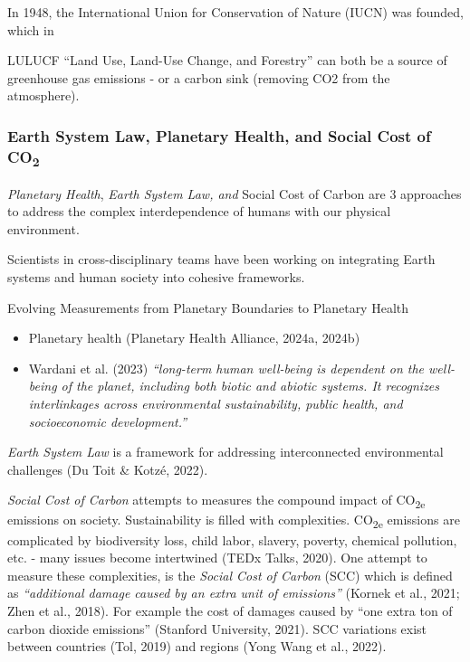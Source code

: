 \documentclass[
  letterpaper,
  DIV=11,
  numbers=noendperiod]{scrartcl}
\begin{document}
In 1948, the International Union for Conservation of Nature (IUCN) was
founded, which in

LULUCF ``Land Use, Land-Use Change, and Forestry'' can both be a source
of greenhouse gas emissions - or a carbon sink (removing CO2 from the
atmosphere).

\subsubsection{\texorpdfstring{Earth System Law, Planetary Health, and
Social Cost of
CO\textsubscript{2}}{Earth System Law, Planetary Health, and Social Cost of CO2}}\label{earth-system-law-planetary-health-and-social-cost-of-co2}

\emph{Planetary Health}, \emph{Earth System Law, and} Social Cost of
Carbon are 3 approaches to address the complex interdependence of humans
with our physical environment.

Scientists in cross-disciplinary teams have been working on integrating
Earth systems and human society into cohesive frameworks.

Evolving Measurements from Planetary Boundaries to Planetary Health

\begin{itemize}
\item
  Planetary health (Planetary Health Alliance, 2024a, 2024b)
\item
  Wardani et al. (2023) \emph{``long-term human well-being is dependent
  on the well-being of the planet, including both biotic and abiotic
  systems. It recognizes interlinkages across environmental
  sustainability, public health, and socioeconomic development.''}
\end{itemize}

\emph{Earth System Law} is a framework for addressing interconnected
environmental challenges (Du Toit \& Kotzé, 2022).

\emph{Social Cost of Carbon} attempts to measures the compound impact of
CO\textsubscript{2e} emissions on society. Sustainability is filled with
complexities. CO\textsubscript{2e} emissions are complicated by
biodiversity loss, child labor, slavery, poverty, chemical pollution,
etc. - many issues become intertwined (TEDx Talks, 2020). One attempt to
measure these complexities, is the \emph{Social Cost of Carbon} (SCC)
which is defined as \emph{``additional damage caused by an extra unit of
emissions''} (Kornek et al., 2021; Zhen et al., 2018). For example the
cost of damages caused by ``one extra ton of carbon dioxide emissions''
(Stanford University, 2021). SCC variations exist between countries
(Tol, 2019) and regions (Yong Wang et al., 2022).
\end{document}
